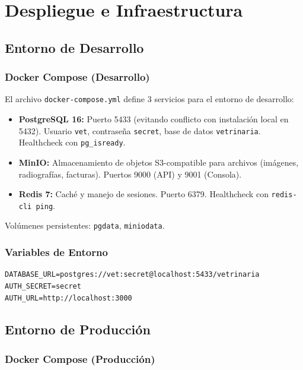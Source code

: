 \chapter{Despliegue e Infraestructura}

\section{Entorno de Desarrollo}

\subsection{Docker Compose (Desarrollo)}

El archivo \texttt{docker-compose.yml} define 3 servicios para el entorno
de desarrollo:

\begin{itemize}[leftmargin=*]
    \item \textbf{PostgreSQL 16:} Puerto 5433 (evitando conflicto con
          instalaci\'on local en 5432). Usuario \texttt{vet}, contrase\~na
          \texttt{secret}, base de datos \texttt{vetrinaria}. Healthcheck
          con \texttt{pg\_isready}.
    \item \textbf{MinIO:} Almacenamiento de objetos S3-compatible para
          archivos (im\'agenes, radiograf\'ias, facturas). Puertos 9000
          (API) y 9001 (Consola).
    \item \textbf{Redis 7:} Cach\'e y manejo de sesiones. Puerto 6379.
          Healthcheck con \texttt{redis-cli ping}.
\end{itemize}

Vol\'umenes persistentes: \texttt{pgdata}, \texttt{miniodata}.

\subsection{Variables de Entorno}

\begin{lstlisting}[style=bash, caption=.env.example - Variables de entorno de desarrollo]
DATABASE_URL=postgres://vet:secret@localhost:5433/vetrinaria
AUTH_SECRET=secret
AUTH_URL=http://localhost:3000
\end{lstlisting}

\section{Entorno de Producci\'on}

\subsection{Docker Compose (Producci\'on)}

